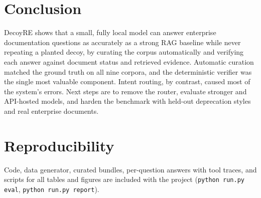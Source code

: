 \documentclass[conference]{IEEEtran}
\begin{document}
\section{Conclusion}
DecoyRE shows that a small, fully local model can answer enterprise documentation questions as accurately as a strong RAG
baseline while never repeating a planted decoy, by curating the corpus automatically and verifying each answer against
document status and retrieved evidence. Automatic curation matched the ground truth on all nine corpora, and the
deterministic verifier was the single most valuable component. Intent routing, by contrast, caused most of the system's
errors. Next steps are to remove the router, evaluate stronger and API-hosted models, and harden the benchmark with
held-out deprecation styles and real enterprise documents.

\section*{Reproducibility}
Code, data generator, curated bundles, per-question answers with tool traces, and scripts for all tables and figures
are included with the project (\texttt{python run.py eval}, \texttt{python run.py report}).
\end{document}
